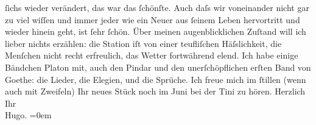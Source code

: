 \begin{ledgroupsized}[t]{13cm}
                    ſichs wieder verändert, das war das ſchönſte. \label{LL435-1v}Auch daſs wir voneinander nicht gar zu viel wiſſen und
                        immer  jeder {\pb}wie ein Neuer aus ſeinem
                        Leben hervortritt und wieder hinein geht, ist ſehr ſchön.\label{LL435-1h}\pend
           \pstart
           Über meinen augenblicklichen Zuſtand will ich lieber nichts erzählen: die Station
                    iſt von einer teufliſchen Häſslichkeit, die Menſchen nicht recht erfreulich, das
                    Wetter fortwährend elend. Ich habe einige Bändchen Platon mit, auch den Pindar und den
                    unerſchöpflichen erſten Band von Goethe: die
                    Lieder, die Elegien, und die Sprüche. Ich freue mich im ſtillen (wenn auch mit
                    Zweifeln) Ihr neues Stück
                    noch im Juni bei der Tini zu
                    hören.\pend
           \pstart
           Herzlich Ihr{\\[\baselineskip]}\spacefill\mbox{Hugo.}\pend
           \leftskip=0em{}\endnumbering{}\end{ledgroupsized}  \newcommand{\dateiname}{L00545}\newcommand{\titel}{Hugo von Hofmannsthal an Arthur Schnitzler, 17. 5. [1896]}\newcommand{\editorInnen}{ Martin Anton Müller und Gerd-Hermann Susen}
            \footnotesize
\begin{ledgroupsized}[t]{11.5cm}
\end{ledgroupsized}
         
      